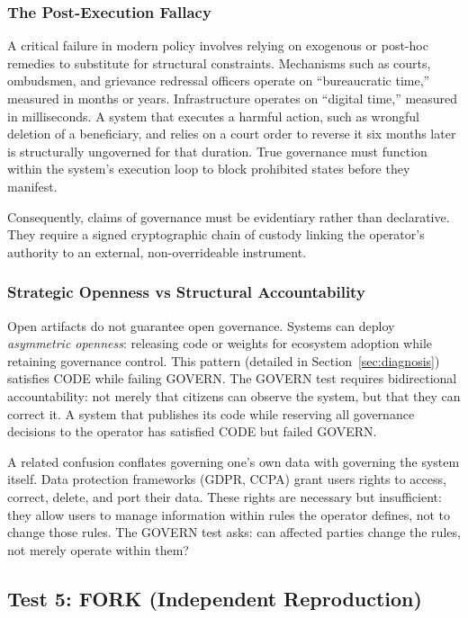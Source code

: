 \documentclass{article}
\begin{document}
\subsubsection{The Post-Execution Fallacy}
A critical failure in modern policy involves relying on exogenous or post-hoc remedies to substitute for structural constraints. Mechanisms such as courts, ombudsmen, and grievance redressal officers operate on ``bureaucratic time,'' measured in months or years. Infrastructure operates on ``digital time,'' measured in milliseconds. A system that executes a harmful action, such as wrongful deletion of a beneficiary, and relies on a court order to reverse it six months later is structurally ungoverned for that duration. True governance must function within the system's execution loop to block prohibited states before they manifest.

Consequently, claims of governance must be evidentiary rather than declarative. They require a signed cryptographic chain of custody linking the operator's authority to an external, non-overrideable instrument.

\subsubsection{Strategic Openness vs Structural Accountability}

Open artifacts do not guarantee open governance. Systems can deploy \textit{asymmetric openness}: releasing code or weights for ecosystem adoption while retaining governance control. This pattern (detailed in Section~\ref{sec:diagnosis}) satisfies CODE while failing GOVERN. The GOVERN test requires bidirectional accountability: not merely that citizens can observe the system, but that they can correct it. A system that publishes its code while reserving all governance decisions to the operator has satisfied CODE but failed GOVERN.

A related confusion conflates governing one's own data with governing the system itself. Data protection frameworks (GDPR, CCPA) grant users rights to access, correct, delete, and port their data. These rights are necessary but insufficient: they allow users to manage information within rules the operator defines, not to change those rules. The GOVERN test asks: can affected parties change the rules, not merely operate within them?

\subsection{Test 5: FORK (Independent Reproduction)}
\end{document}
